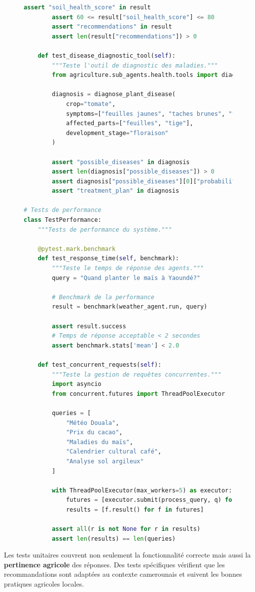 \begin{figure}[H]
\begin{lstlisting}[language=Python, caption=Framework de tests unitaires pour agents ADK]
        assert "soil_health_score" in result
        assert 60 <= result["soil_health_score"] <= 80
        assert "recommendations" in result
        assert len(result["recommendations"]) > 0

    def test_disease_diagnostic_tool(self):
        """Teste l'outil de diagnostic des maladies."""
        from agriculture.sub_agents.health.tools import diagnose_plant_disease

        diagnosis = diagnose_plant_disease(
            crop="tomate",
            symptoms=["feuilles jaunes", "taches brunes", "flétrissement"],
            affected_parts=["feuilles", "tige"],
            development_stage="floraison"
        )

        assert "possible_diseases" in diagnosis
        assert len(diagnosis["possible_diseases"]) > 0
        assert diagnosis["possible_diseases"][0]["probability"] > 50
        assert "treatment_plan" in diagnosis

# Tests de performance
class TestPerformance:
    """Tests de performance du système."""

    @pytest.mark.benchmark
    def test_response_time(self, benchmark):
        """Teste le temps de réponse des agents."""
        query = "Quand planter le maïs à Yaoundé?"

        # Benchmark de la performance
        result = benchmark(weather_agent.run, query)

        assert result.success
        # Temps de réponse acceptable < 2 secondes
        assert benchmark.stats['mean'] < 2.0

    def test_concurrent_requests(self):
        """Teste la gestion de requêtes concurrentes."""
        import asyncio
        from concurrent.futures import ThreadPoolExecutor

        queries = [
            "Météo Douala",
            "Prix du cacao",
            "Maladies du maïs",
            "Calendrier cultural café",
            "Analyse sol argileux"
        ]

        with ThreadPoolExecutor(max_workers=5) as executor:
            futures = [executor.submit(process_query, q) for q in queries]
            results = [f.result() for f in futures]

        assert all(r is not None for r in results)
        assert len(results) == len(queries)
\end{lstlisting}
\end{figure}

Les tests unitaires couvrent non seulement la fonctionnalité correcte mais aussi la \textbf{pertinence agricole} des réponses. Des tests spécifiques vérifient que les recommandations sont adaptées au contexte camerounais et suivent les bonnes pratiques agricoles locales.

